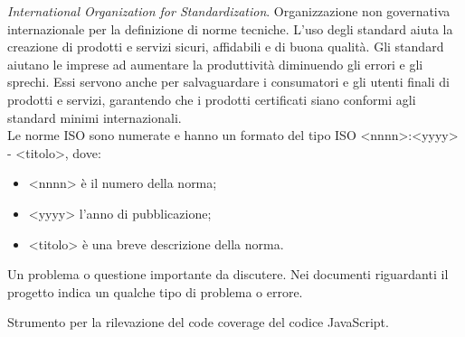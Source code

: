 \textit{International Organization for Standardization}. Organizzazione non governativa internazionale per la definizione di norme tecniche. 
L'uso degli standard aiuta la creazione di prodotti e servizi sicuri, affidabili e di buona qualità. Gli standard aiutano le imprese ad aumentare la produttività diminuendo gli errori e gli sprechi. Essi servono anche per salvaguardare i consumatori e gli utenti finali di prodotti e servizi, garantendo che i prodotti certificati siano conformi agli standard minimi internazionali. \\
Le norme ISO sono numerate e hanno un formato del tipo ISO <nnnn>:<yyyy> - <titolo>, dove:
\begin{itemize}
	\item <nnnn> è il numero della norma;
	\item <yyyy> l'anno di pubblicazione;
	\item <titolo> è una breve descrizione della norma.
\end{itemize}

Un problema o questione importante da discutere.
Nei documenti riguardanti il progetto \progetto{} indica un qualche tipo di problema o errore.

Strumento  per la rilevazione del code coverage del codice JavaScript.
